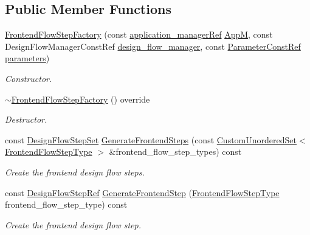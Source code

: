 \subsection*{Public Member Functions}
\begin{DoxyCompactItemize}
\item 
\hyperlink{classFrontendFlowStepFactory_a78215963a4103afc850b8724e04164b9}{Frontend\+Flow\+Step\+Factory} (const \hyperlink{application__manager_8hpp_a04ccad4e5ee401e8934306672082c180}{application\+\_\+manager\+Ref} \hyperlink{classFrontendFlowStepFactory_ae382b19905edb984bb595f22dca874d3}{AppM}, const Design\+Flow\+Manager\+Const\+Ref \hyperlink{classDesignFlowStepFactory_ae7854875d87ed8d2fb4d82b2fa017b79}{design\+\_\+flow\+\_\+manager}, const \hyperlink{Parameter_8hpp_a37841774a6fcb479b597fdf8955eb4ea}{Parameter\+Const\+Ref} \hyperlink{classDesignFlowStepFactory_ab2c8bba23db9f4066e1a27ee7157c2de}{parameters})
\begin{DoxyCompactList}\small\item\em Constructor. \end{DoxyCompactList}\item 
\hyperlink{classFrontendFlowStepFactory_a4f65a248e1febbdf593ac04397a0100f}{$\sim$\+Frontend\+Flow\+Step\+Factory} () override
\begin{DoxyCompactList}\small\item\em Destructor. \end{DoxyCompactList}\item 
const \hyperlink{classDesignFlowStepSet}{Design\+Flow\+Step\+Set} \hyperlink{classFrontendFlowStepFactory_af2ae8d671cc18ec7bb69e8dc249d18d7}{Generate\+Frontend\+Steps} (const \hyperlink{classCustomUnorderedSet}{Custom\+Unordered\+Set}$<$ \hyperlink{frontend__flow__step_8hpp_afeb3716c693d2b2e4ed3e6d04c3b63bb}{Frontend\+Flow\+Step\+Type} $>$ \&frontend\+\_\+flow\+\_\+step\+\_\+types) const
\begin{DoxyCompactList}\small\item\em Create the frontend design flow steps. \end{DoxyCompactList}\item 
const \hyperlink{design__flow__step_8hpp_a9dd6b4474ddf52d41a78b1aaa12ae6c8}{Design\+Flow\+Step\+Ref} \hyperlink{classFrontendFlowStepFactory_ac7a8cb4ae2c919fb2d4d44eed8e1c0fa}{Generate\+Frontend\+Step} (\hyperlink{frontend__flow__step_8hpp_afeb3716c693d2b2e4ed3e6d04c3b63bb}{Frontend\+Flow\+Step\+Type} frontend\+\_\+flow\+\_\+step\+\_\+type) const
\begin{DoxyCompactList}\small\item\em Create the frontend design flow step. \end{DoxyCompactList}\item 

\end{DoxyCompactItemize}
